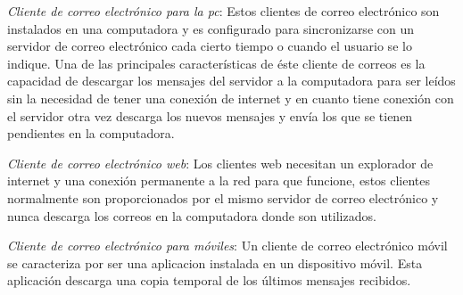 \begin{itemize}
 \textit{Cliente de correo electrónico para la pc}:
Estos clientes de correo electrónico son instalados en una computadora y es configurado para sincronizarse con un servidor de correo electrónico cada cierto tiempo o cuando el usuario se lo indique. 
Una  de  las  principales  características  de  éste  cliente  de  correos  es  la  capacidad  de descargar los mensajes del servidor a la computadora para ser leídos sin la necesidad de tener  una  conexión  de  internet  y  en  cuanto  tiene  conexión  con  el  servidor  otra  vez 
descarga los nuevos mensajes y envía los que se tienen pendientes en la computadora. 

 \textit{Cliente de correo electrónico web}:
Los  clientes  web  necesitan  un  explorador  de  internet  y  una  conexión  permanente  a  la red  para  que  funcione,  estos  clientes  normalmente  son  proporcionados  por  el  mismo servidor de correo electrónico y nunca descarga los correos en la computadora donde son utilizados. 

 \textit{Cliente de correo electrónico para móviles}:
Un  cliente  de  correo electrónico  móvil  se  caracteriza  por  ser una  aplicacion  instalada  en  un dispositivo  móvil. Esta aplicación descarga una copia temporal de los últimos mensajes recibidos.  


\end{itemize}

